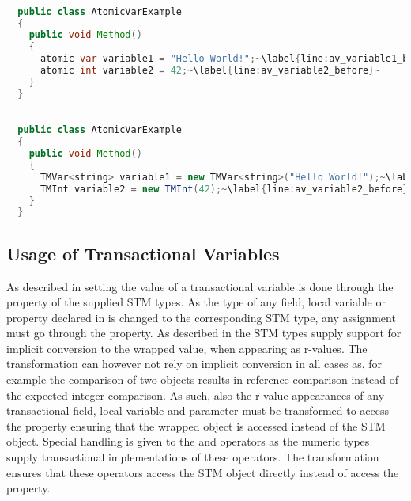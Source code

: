 \begin{lstlisting}[label=lst:before_atomic_variable,
  caption={\bscode{atomic} Local Variables Before Transformation},
  language=Java,  
  showspaces=false,
  showtabs=false,
  breaklines=true,
  showstringspaces=false,
  breakatwhitespace=true,
  escapechar=~,
  commentstyle=\color{greencomments},
  keywordstyle=\color{bluekeywords},
  stringstyle=\color{redstrings},
  morekeywords={atomic, retry, orelse, var, get, set}]  % Start your code-block

  public class AtomicVarExample
  {
    public void Method()
    {
      atomic var variable1 = "Hello World!";~\label{line:av_variable1_before}~
      atomic int variable2 = 42;~\label{line:av_variable2_before}~
    }
  }
\end{lstlisting}

\begin{lstlisting}[label=lst:after_atomic_variable,
  caption={\bscode{atomic} Local Variables After Transformation},
  language=Java,  
  showspaces=false,
  showtabs=false,
  breaklines=true,
  showstringspaces=false,
  breakatwhitespace=true,
  escapechar=~,
  commentstyle=\color{greencomments},
  keywordstyle=\color{bluekeywords},
  stringstyle=\color{redstrings},
  morekeywords={atomic, retry, orelse, var, get, set, string}]  % Start your code-block

  public class AtomicVarExample
  {
    public void Method()
    {
      TMVar<string> variable1 = new TMVar<string>("Hello World!");~\label{line:av_variable1_before}~
      TMInt variable2 = new TMInt(42);~\label{line:av_variable2_before}~
    }
  }
\end{lstlisting}

\subsection{Usage of Transactional Variables}
As described in  setting the value of a transactional variable is done through the  property of the supplied \ac{STM} types. As the type of any field, local variable or property declared  in \stmnamesp is changed to the corresponding \ac{STM} type, any assignment must go through the  property. As described in  the \ac{STM} types supply support for implicit conversion to the wrapped value, when appearing as r-values. The transformation can however not rely on implicit conversion in all cases as, for example the comparison of two  objects results in reference comparison instead of the expected integer comparison. As such, also the r-value appearances of any transactional field, local variable and parameter must be transformed to access the  property ensuring that the wrapped object is accessed instead of the \ac{STM} object. Special handling is given to the \bscode{++} and \bscode{--} operators as the numeric  types supply transactional implementations of these operators. The transformation ensures that these operators access the \ac{STM} object directly instead of access the  property.

